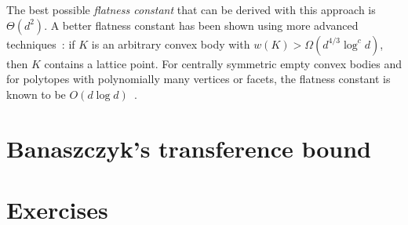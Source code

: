 The best possible \emph{flatness constant} that can be derived with this approach is $\Theta(d^2)$.
A better flatness constant has been shown using more advanced techniques~\cite{MR1854250, MR1755679}:
if $K$ is an arbitrary convex body with $w(K) > \Omega(d^{4/3} \log^c d)$,
then $K$ contains a lattice point.
For centrally symmetric empty convex bodies
and for polytopes with polynomially many vertices or facets,
the flatness constant is known to be $O(d \log d)$~\cite{MR1410163,MR1854250}.



\section{Banaszczyk's transference bound}
\label{sec:transference-bound-banaszczyk}




\section*{Exercises}

